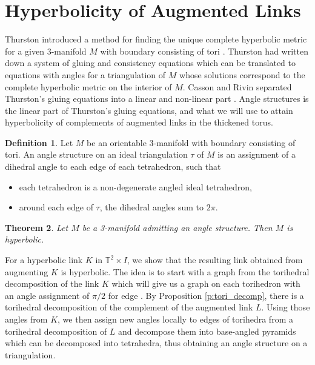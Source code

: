 \documentclass[11pt]{amsart}
\newcommand{\prpref}[1]{Proposition \ref{#1}}
\newcommand{\torus}{{\mathbb{T}^2}}
\theoremstyle{plain}
\newtheorem{theorem}{Theorem}[section]
\theoremstyle{definition}
\newtheorem{define}[theorem]{Definition}
\begin{document}
\section{Hyperbolicity of Augmented Links}
\label{s:hyperbolicity}
Thurston introduced a method for finding the unique complete hyperbolic metric for a
given 3-manifold $M$ with boundary consisting of tori \cite{Thurston}. 
Thurston had written down a system
of gluing and consistency equations which can be translated to 
equations with angles for a triangulation of $M$ whose solutions correspond to the
complete hyperbolic metric on the interior of $M$. Casson and Rivin separated Thurston's
gluing equations into a linear and non-linear part \cite{Casson-Rivin}. Angle
structures is the linear part of Thurston's gluing equations, and what we will
use to attain hyperbolicity of complements of augmented links in the thickened
torus.


\begin{define}
Let $M$ be an orientable 3-manifold with boundary consisting of tori. An angle
structure on an ideal triangulation $\tau$ of $M$ is an assignment of a dihedral
angle to each edge of each tetrahedron, such that
\begin{itemize}
\item each tetrahedron is a non-degenerate angled ideal tetrahedron,
\item around each edge of $\tau$, the dihedral angles sum to $2\pi$.
\end{itemize}
\end{define}

\begin{theorem}\cite{TODO: find rivin's paper? should be in here https://arxiv.org/pdf/1004.0440.pdf}
Let $M$ be a 3-manifold admitting an angle structure. Then $M$ is hyperbolic.
\end{theorem}

For a hyperbolic link $K$ in $\torus \times I$, we show
that the resulting link obtained from augmenting $K$ is
hyperbolic. The idea is to start with a graph from the torihedral decomposition
of the link $K$ which will give us a graph on each torihedron with an angle
assignment of
$\pi/2$ for edge
\cite{CKP2}.
By \prpref{p:tori_decomp},
there is a torihedral decomposition of the complement of the augmented link $L$.
Using those angles from $K$,
we then assign new angles locally to edges of torihedra from a torihedral 
decomposition of $L$
and decompose them into base-angled pyramids which can be decomposed 
into tetrahedra, thus obtaining an angle structure on a triangulation.
\end{document}
